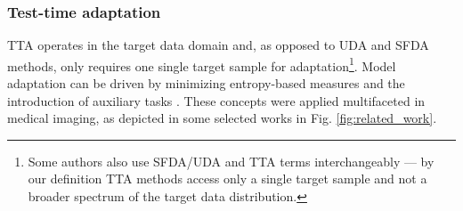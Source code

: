         \subsubsection{Test-time adaptation} %

        TTA operates in the target data domain and, as opposed to UDA and SFDA methods, only requires one single target sample for adaptation\footnote{Some authors also use SFDA/UDA and TTA terms interchangeably --- by our definition TTA methods access only a single target sample and not a broader spectrum of the target data distribution.}.
        Model adaptation can be driven by minimizing entropy-based measures \citep{wang2020tent,bateson2020source}
        and the introduction of auxiliary tasks \citep{sun2020test,karani2021test,lyu2022learning}.
        These concepts were applied multifaceted in medical imaging, as depicted in some selected works in Fig. \ref{fig:related_work}.


